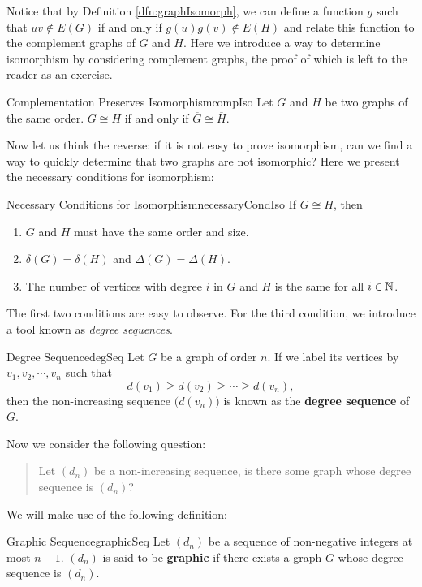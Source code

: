 \documentclass[math, code]{amznotes}
\theoremstyle{remark}
\begin{document}
Notice that by Definition \ref{dfn:graphIsomorph}, we can define a function $g$ such that $uv \notin E(G)$ if and only if $g(u)g(v) \notin E(H)$ and relate this function to the complement graphs of $G$ and $H$. Here we introduce a way to determine isomorphism by considering complement graphs, the proof of which is left to the reader as an exercise.
\begin{thmbox}{Complementation Preserves Isomorphism}{compIso}
    Let $G$ and $H$ be two graphs of the same order. $G \cong H$ if and only if $\overline{G} \cong \overline{H}$.
\end{thmbox}
Now let us think the reverse: if it is not easy to prove isomorphism, can we find a way to quickly determine that two graphs are not isomorphic? Here we present the necessary conditions for isomorphism:
\begin{thmbox}{Necessary Conditions for Isomorphism}{necessaryCondIso}
    If $G \cong H$, then
    \begin{enumerate}
        \item $G$ and $H$ must have the same order and size.
        \item $\delta(G) = \delta(H)$ and $\Delta(G) = \Delta(H)$.
        \item The number of vertices with degree $i$ in $G$ and $H$ is the same for all $i \in \mathbb{N}$.
    \end{enumerate}
\end{thmbox}
The first two conditions are easy to observe. For the third condition, we introduce a tool known as \textit{degree sequences}.
\begin{dfnbox}{Degree Sequence}{degSeq}
    Let $G$ be a graph of order $n$. If we label its vertices by $v_1, v_2, \cdots, v_n$ such that
    \begin{equation*}
        d(v_1) \geq d(v_2) \geq \cdots \geq d(v_n),
    \end{equation*}
    then the non-increasing sequence $\bigl(d(v_n)\bigr)$ is known as the {\color{red} \textbf{degree sequence}} of $G$.
\end{dfnbox}
Now we consider the following question:
\begin{quote}
    Let $(d_n)$ be a non-increasing sequence, is there some graph whose degree sequence is $(d_n)$?
\end{quote}
We will make use of the following definition:
\begin{dfnbox}{Graphic Sequence}{graphicSeq}
    Let $(d_n)$ be a sequence of non-negative integers at most $n - 1$. $(d_n)$ is said to be {\color{red} \textbf{graphic}} if there exists a graph $G$ whose degree sequence is $(d_n)$.
\end{dfnbox}
\end{document}
